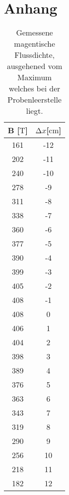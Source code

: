\section{Anhang}

\begin{table}
    \centering
    \caption{Gemessene magentische Flussdichte, ausgehened vom Maximum welches bei der Probenleerstelle liegt.}
    \label{tab:diff}
    \begin{tabular}{c c}
    \toprule
     B [$\si{\tesla}$] &  $\increment x $[$\si{\centi\meter}$] \\
     \midrule
     161&  -12   \\   
     202&  -11  \\
     240&  -10  \\
     278&  -9  \\
     311&  -8  \\
     338&  -7  \\
     360&  -6  \\
     377&  -5  \\
     390&  -4  \\
     399&  -3  \\
     405&  -2  \\
     408&  -1  \\
     408&  0  \\
     406&  1  \\
     404&  2  \\
     398&  3  \\
     389&  4   \\
     376&  5  \\
     363&  6  \\
     343&  7  \\
     319&  8  \\
     290&  9  \\
     256&  10  \\
     218&  11  \\
     182&  12  \\
    \end{tabular}
\end{table}



